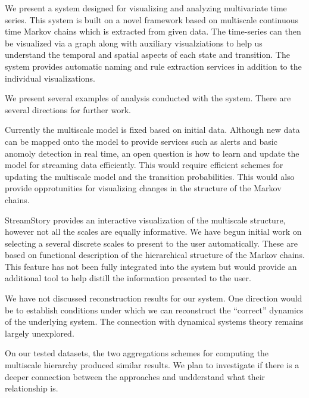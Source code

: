 We present a system designed for visualizing and analyzing multivariate time series. This system is built on a novel framework based on multiscale continuous time Markov chains which is extracted from given data. The time-series can then be visualized via a graph along with auxiliary visualziations to help us understand the temporal and spatial aspects of each state and transition. The system provides automatic naming and rule extraction services in addition to the individual visualizations.  

We present several examples of analysis conducted with the system.  There are several directions for further work. 

 Currently the multiscale model is fixed based on initial data. Although new data can be mapped onto the model to provide services such as alerts and basic anomoly detection in real time, an open question is how to learn and update the model for streaming data efficiently. This would require efficient schemes for updating the multiscale model and the transition probabilities. This would also provide opprotunities for visualizing changes in the structure of the Markov chains.

 StreamStory provides an interactive visualization of the multiscale structure, however not all the scales are equally informative.  We have begun initial work on selecting a several discrete scales to present to the user automatically. These are based on functional description of the hierarchical structure of the Markov chains. This feature has not been fully integrated into the system but would provide an additional tool to help distill the  information presented to the user. 

 We have not discussed reconstruction results for our system. One direction would be to establish conditions under which we can reconstruct the ``correct'' dynamics of the underlying system. The connection with dynamical systems theory remains largely unexplored.

 On our tested datasets, the two aggregations schemes for computing the multiscale hierarchy produced similar results. We plan to investigate if there is a deeper connection between the approaches and undderstand what their relationship is. 







